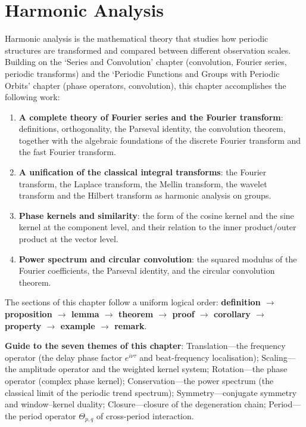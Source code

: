 \chapter{Harmonic Analysis}
\label{chap:harmonic}
\label{chap:harmonic-analysis}

\begin{remark}\label{rem:harmonic_chapter_positioning}
Harmonic analysis is the mathematical theory that studies how periodic structures are transformed and compared between different observation scales. Building on the `Series and Convolution' chapter (convolution, Fourier series, periodic transforms) and the `Periodic Functions and Groups with Periodic Orbits' chapter (phase operators, convolution), this chapter accomplishes the following work:
\begin{enumerate}[label=(\arabic*)]
    \item \textbf{A complete theory of Fourier series and the Fourier transform}: definitions, orthogonality, the Parseval identity, the convolution theorem, together with the algebraic foundations of the discrete Fourier transform and the fast Fourier transform.
    \item \textbf{A unification of the classical integral transforms}: the Fourier transform, the Laplace transform, the Mellin transform, the wavelet transform and the Hilbert transform as harmonic analysis on groups.
    \item \textbf{Phase kernels and similarity}: the form of the cosine kernel and the sine kernel at the component level, and their relation to the inner product/outer product at the vector level.
    \item \textbf{Power spectrum and circular convolution}: the squared modulus of the Fourier coefficients, the Parseval identity, and the circular convolution theorem.
\end{enumerate}
The sections of this chapter follow a uniform logical order: \textbf{definition $\to$ proposition $\to$ lemma $\to$ theorem $\to$ proof $\to$ corollary $\to$ property $\to$ example $\to$ remark}.

\textbf{Guide to the seven themes of this chapter}: Translation---the frequency operator (the delay phase factor $e^{i\nu\tau}$ and beat-frequency localisation); Scaling---the amplitude operator and the weighted kernel system; Rotation---the phase operator (complex phase kernel); Conservation---the power spectrum (the classical limit of the periodic trend spectrum); Symmetry---conjugate symmetry and window--kernel duality; Closure---closure of the degeneration chain; Period---the period operator $\Theta_{p,q}$ of cross-period interaction.
\end{remark}

